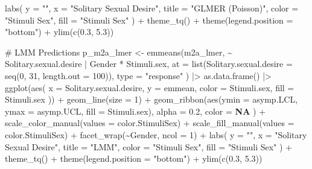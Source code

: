 \documentclass[
  bookmarksnumbered]{article}
\newenvironment{Shaded}{\begin{snugshade}}{\end{snugshade}}
\newcommand{\AttributeTok}[1]{\textcolor[rgb]{0.80,0.80,0.80}{#1}}
\newcommand{\CommentTok}[1]{\textcolor[rgb]{0.50,0.62,0.50}{#1}}
\newcommand{\ConstantTok}[1]{\textcolor[rgb]{0.86,0.64,0.64}{\textbf{#1}}}
\newcommand{\DecValTok}[1]{\textcolor[rgb]{0.86,0.86,0.80}{#1}}
\newcommand{\FloatTok}[1]{\textcolor[rgb]{0.75,0.75,0.82}{#1}}
\newcommand{\FunctionTok}[1]{\textcolor[rgb]{0.94,0.94,0.56}{#1}}
\newcommand{\NormalTok}[1]{\textcolor[rgb]{0.80,0.80,0.80}{#1}}
\newcommand{\OtherTok}[1]{\textcolor[rgb]{0.94,0.94,0.56}{#1}}
\newcommand{\SpecialCharTok}[1]{\textcolor[rgb]{0.86,0.64,0.64}{#1}}
\newcommand{\StringTok}[1]{\textcolor[rgb]{0.80,0.58,0.58}{#1}}
\begin{document}
\begin{Shaded}
\begin{Highlighting}[]
  \FunctionTok{labs}\NormalTok{(}
    \AttributeTok{y =} \StringTok{""}\NormalTok{, }\AttributeTok{x =} \StringTok{"Solitary Sexual Desire"}\NormalTok{,}
    \AttributeTok{title =} \StringTok{"GLMER (Poisson)"}\NormalTok{,}
    \AttributeTok{color =} \StringTok{"Stimuli Sex"}\NormalTok{, }\AttributeTok{fill =} \StringTok{"Stimuli Sex"}
\NormalTok{  ) }\SpecialCharTok{+}
  \FunctionTok{theme\_tq}\NormalTok{() }\SpecialCharTok{+}
  \FunctionTok{theme}\NormalTok{(}\AttributeTok{legend.position =} \StringTok{"bottom"}\NormalTok{) }\SpecialCharTok{+}
  \FunctionTok{ylim}\NormalTok{(}\FunctionTok{c}\NormalTok{(}\FloatTok{0.3}\NormalTok{, }\FloatTok{5.3}\NormalTok{))}

\CommentTok{\# LMM Predictions}
\NormalTok{p\_m2a\_lmer }\OtherTok{\textless{}{-}} \FunctionTok{emmeans}\NormalTok{(m2a\_lmer, }\SpecialCharTok{\textasciitilde{}}\NormalTok{ Solitary.sexual.desire }\SpecialCharTok{|}\NormalTok{ Gender }\SpecialCharTok{*}\NormalTok{ Stimuli.sex,}
  \AttributeTok{at =} \FunctionTok{list}\NormalTok{(}\AttributeTok{Solitary.sexual.desire =} \FunctionTok{seq}\NormalTok{(}\DecValTok{0}\NormalTok{, }\DecValTok{31}\NormalTok{, }\AttributeTok{length.out =} \DecValTok{100}\NormalTok{)),}
  \AttributeTok{type =} \StringTok{"response"}
\NormalTok{) }\SpecialCharTok{|\textgreater{}}
  \FunctionTok{as.data.frame}\NormalTok{() }\SpecialCharTok{|\textgreater{}}
  \FunctionTok{ggplot}\NormalTok{(}\FunctionTok{aes}\NormalTok{(}
    \AttributeTok{x =}\NormalTok{ Solitary.sexual.desire, }\AttributeTok{y =}\NormalTok{ emmean,}
    \AttributeTok{color =}\NormalTok{ Stimuli.sex, }\AttributeTok{fill =}\NormalTok{ Stimuli.sex}
\NormalTok{  )) }\SpecialCharTok{+}
  \FunctionTok{geom\_line}\NormalTok{(}\AttributeTok{size =} \DecValTok{1}\NormalTok{) }\SpecialCharTok{+}
  \FunctionTok{geom\_ribbon}\NormalTok{(}\FunctionTok{aes}\NormalTok{(}\AttributeTok{ymin =}\NormalTok{ asymp.LCL, }\AttributeTok{ymax =}\NormalTok{ asymp.UCL, }\AttributeTok{fill =}\NormalTok{ Stimuli.sex),}
    \AttributeTok{alpha =} \FloatTok{0.2}\NormalTok{, }\AttributeTok{color =} \ConstantTok{NA}
\NormalTok{  ) }\SpecialCharTok{+}
  \FunctionTok{scale\_color\_manual}\NormalTok{(}\AttributeTok{values =}\NormalTok{ color.StimuliSex) }\SpecialCharTok{+}
  \FunctionTok{scale\_fill\_manual}\NormalTok{(}\AttributeTok{values =}\NormalTok{ color.StimuliSex) }\SpecialCharTok{+}
  \FunctionTok{facet\_wrap}\NormalTok{(}\SpecialCharTok{\textasciitilde{}}\NormalTok{Gender, }\AttributeTok{ncol =} \DecValTok{1}\NormalTok{) }\SpecialCharTok{+}
  \FunctionTok{labs}\NormalTok{(}
    \AttributeTok{y =} \StringTok{""}\NormalTok{, }\AttributeTok{x =} \StringTok{"Solitary Sexual Desire"}\NormalTok{,}
    \AttributeTok{title =} \StringTok{"LMM"}\NormalTok{,}
    \AttributeTok{color =} \StringTok{"Stimuli Sex"}\NormalTok{, }\AttributeTok{fill =} \StringTok{"Stimuli Sex"}
\NormalTok{  ) }\SpecialCharTok{+}
  \FunctionTok{theme\_tq}\NormalTok{() }\SpecialCharTok{+}
  \FunctionTok{theme}\NormalTok{(}\AttributeTok{legend.position =} \StringTok{"bottom"}\NormalTok{) }\SpecialCharTok{+}
  \FunctionTok{ylim}\NormalTok{(}\FunctionTok{c}\NormalTok{(}\FloatTok{0.3}\NormalTok{, }\FloatTok{5.3}\NormalTok{))}


\end{Highlighting}
\end{Shaded}
\end{document}
